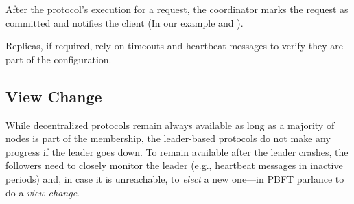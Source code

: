     After the protocol's execution for a request, the coordinator marks the request as committed and notifies the client (In our example  and ).
    
     Replicas, if required, rely on timeouts and heartbeat messages to verify they are part of the configuration. %





\subsection{View Change}
\fi

While decentralized protocols remain always available as long as a majority of nodes is part of the membership, the leader-based protocols do not make any progress if the leader goes down. To remain available after the leader crashes, the followers need to closely monitor the leader (e.g., heartbeat messages in inactive periods) and, in case it is unreachable, to \emph{elect} a new one---in PBFT parlance to do a \emph{view change}.



